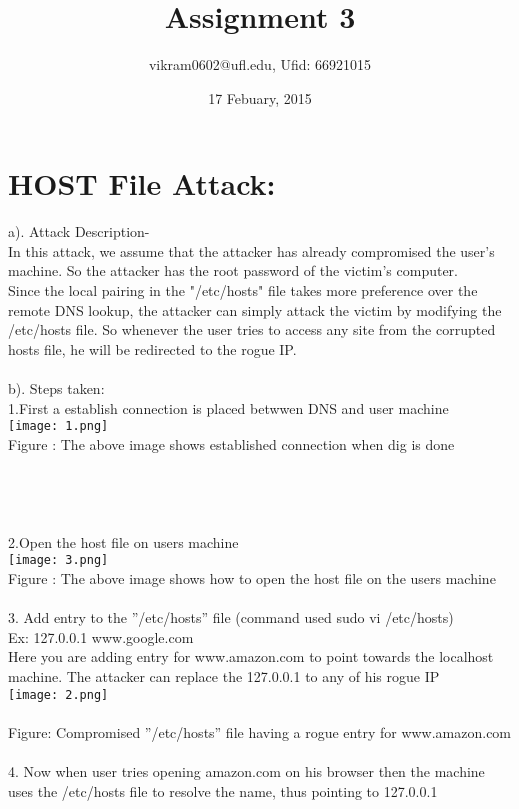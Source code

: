 \documentclass{article}
\title{Assignment 3}
\author{vikram0602@ufl.edu, Ufid: 66921015}
\date{17 Febuary, 2015}
\begin{document}
\maketitle
\section{HOST File Attack:}
a). Attack Description- \\
In this attack, we assume that the attacker has already compromised the user's machine. So the attacker has the root password of the victim's computer.
\\
Since the local pairing in the "/etc/hosts" file takes more preference over the remote DNS lookup, the attacker can simply attack the victim by modifying the /etc/hosts file. So whenever the user tries to access any site from the corrupted hosts file, he will be redirected to the rogue IP.
\\
\\
b). Steps taken:
\\
1.First a establish connection is placed betwwen DNS and user machine
\\
\texttt{[image: 1.png]}
\\Figure : The above image shows established connection when dig is done
\\
\\ \\ \\ \\
2.Open the host file on users machine
\\
\texttt{[image: 3.png]}
\\Figure : The above image shows how to open the host file on the users machine 
\\ 
\\
3. Add entry to the ”/etc/hosts” file (command used sudo vi /etc/hosts)\\ 
Ex: 127.0.0.1 www.google.com\\ 
Here you are adding entry for www.amazon.com to point towards the localhost machine. The attacker can replace the 127.0.0.1 to any of his rogue IP\\
\texttt{[image: 2.png]}
\\
\\
Figure: Compromised ”/etc/hosts” file having a rogue entry for www.amazon.com
\\
\\
4. Now when user tries opening amazon.com on his browser then the machine uses the /etc/hosts file to resolve the name, thus pointing to 127.0.0.1
\end{document}
